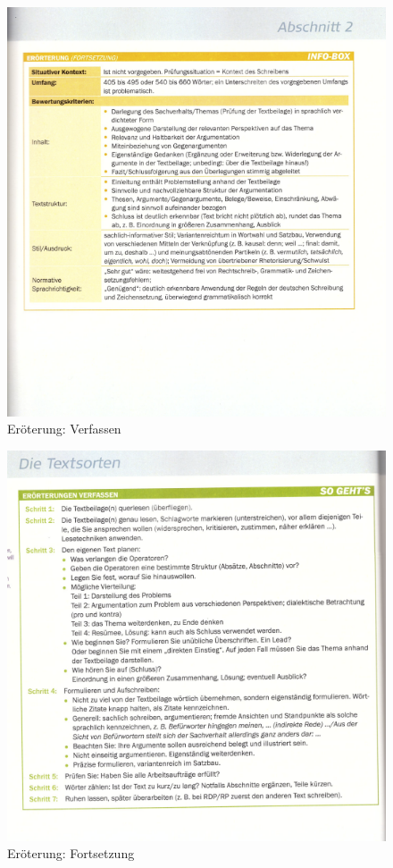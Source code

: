 \begin{figure}[h]
    \centering
    \includegraphics[scale=0.8]{pics/Screenshot from 2023-02-06 12-27-06.png}
    \caption{Eröterung: Verfassen}
    \label{fig:impl:eröterung2}
\end{figure}
\begin{figure}[h]
    \centering
    \includegraphics[scale=0.8]{pics/Screenshot from 2023-02-06 12-27-29.png}
    \caption{Eröterung: Fortsetzung}
    \label{fig:impl:eröterung3}
\end{figure}
